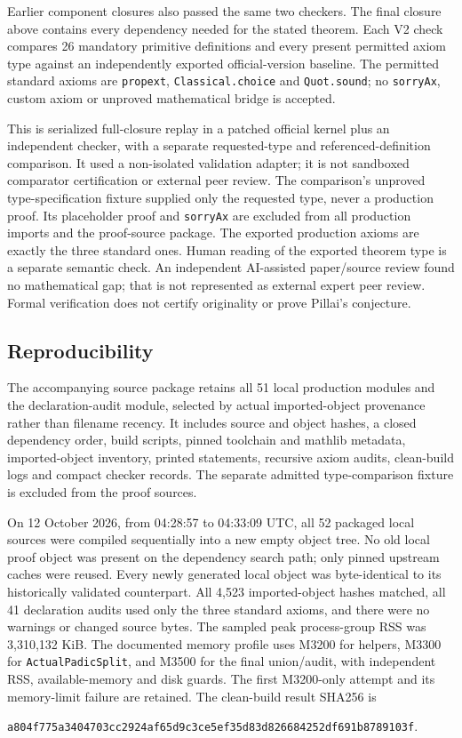 \documentclass[11pt,letterpaper]{article}
\theoremstyle{remark}\newtheorem{remark}[theorem]{Remark}
\newcommand{\lean}[1]{{\small\urlstyle{tt}\nolinkurl{#1}}}
\begin{document}
Earlier component closures also passed the same two checkers. The final
closure above contains every dependency needed for the stated theorem.
Each V2 check compares 26 mandatory primitive definitions and every present
permitted axiom type against an independently exported official-version
baseline. The permitted standard axioms are \lean{propext},
\lean{Classical.choice} and \lean{Quot.sound}; no \lean{sorryAx},
custom axiom or unproved mathematical bridge is accepted.

This is serialized full-closure replay in a patched official kernel plus
an independent checker, with a separate requested-type and
referenced-definition comparison. It used a non-isolated validation
adapter; it is not sandboxed comparator certification or external peer review.
The comparison's unproved type-specification fixture supplied only the
requested type, never a production proof. Its placeholder proof and
\lean{sorryAx} are excluded from all production imports and the proof-source
package. The exported production axioms are exactly the three standard ones.
Human reading of the exported theorem type is a separate semantic check.
An independent AI-assisted paper/source review found no mathematical gap;
that is not represented as external expert peer review.
Formal verification does not certify originality or prove Pillai's conjecture.

\subsection{Reproducibility}

The accompanying source package retains all 51 local production modules
and the declaration-audit module, selected by actual imported-object
provenance rather than filename recency. It includes source and object
hashes, a closed dependency order, build scripts, pinned toolchain and
mathlib metadata, imported-object inventory, printed statements, recursive
axiom audits, clean-build logs and compact checker records. The separate
admitted type-comparison fixture is excluded from the proof sources.

On 12 October 2026, from 04:28:57 to 04:33:09 UTC, all 52 packaged local
sources were compiled sequentially into a new empty object tree. No old
local proof object was present on the dependency search path; only pinned
upstream caches were reused. Every newly generated local object was
byte-identical to its historically validated counterpart. All 4,523
imported-object hashes matched, all 41 declaration audits used only the
three standard axioms, and there were no warnings or changed source bytes.
The sampled peak process-group RSS was 3,310,132 KiB. The documented memory
profile uses M3200 for helpers, M3300 for \lean{ActualPadicSplit}, and
M3500 for the final union/audit, with independent RSS, available-memory and
disk guards. The first M3200-only attempt and its memory-limit failure
are retained. The clean-build result SHA256 is
\begin{center}\small\nolinkurl{a804f775a3404703cc2924af65d9c3ce5ef35d83d826684252df691b8789103f}.\end{center}
\end{document}
